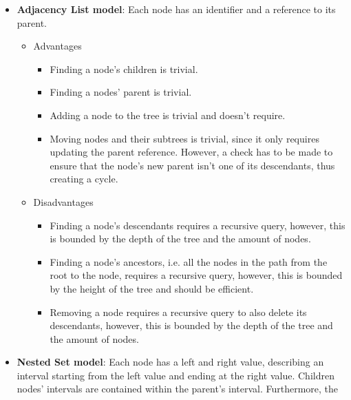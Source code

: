 %
\begin{itemize}
  \item \textbf{Adjacency List model}: Each node has an identifier and a reference to its parent.
    \begin{itemize}
      \item Advantages
        \begin{itemize}
        \item Finding a node's children is trivial.
        \item Finding a nodes' parent is trivial.
        \item Adding a node to the tree is trivial and doesn't require. 
        \item Moving nodes and their subtrees is trivial, since it only requires updating
          the parent reference. However, a check has to be made to ensure that the node's
            new parent isn't one of its descendants, thus creating a cycle.
        \end{itemize}
      \item Disadvantages
        \begin{itemize}
        \item Finding a node's descendants requires a recursive query, however,
          this is bounded by the depth of the tree and the amount of nodes.
        \item Finding a node's ancestors, i.e. all the nodes in the path from the root to
          the node, requires a recursive query, however, this is bounded by the height of
            the tree and should be efficient.
        \item Removing a node requires a recursive query to also delete its descendants,
          however, this is bounded by the depth of
            the tree and the amount of nodes.
      \end{itemize}
    \end{itemize}
  \item \textbf{Nested Set model}: Each node has a left and right value, describing an
    interval starting from the left value and ending at the right value.
    Children nodes' intervals are contained within the parent's interval. Furthermore, the

\end{itemize}
